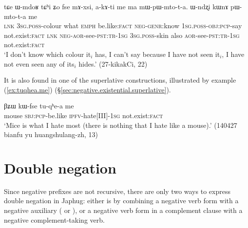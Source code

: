 \begin{exe}
	\ex \label{ex:pWmtota.me2}
	\gll  tɕe ɯ-mdoʁ tɕʰi ʑo fse mɤ-xsi, a-kɤ-ti me ma mɯ-pɯ-mto-t-a. ɯ-ndʐi kɯnɤ pɯ-mto-t-a me \\
	\textsc{lnk} \textsc{3sg}.\textsc{poss}-colour what \textsc{emph} be.like:\textsc{fact} \textsc{neg}-\textsc{genr}:know \textsc{1sg}.\textsc{poss}-\textsc{obj}:\textsc{pcp}-say not.exist:\textsc{fact} \textsc{lnk} \textsc{neg}-\textsc{aor}-see-\textsc{pst}:\textsc{tr}-\textsc{1sg} \textsc{3sg}.\textsc{poss}-skin also \textsc{aor}-see-\textsc{pst}:\textsc{tr}-\textsc{1sg} not.exist:\textsc{fact} \\
	\glt `I don't know which colour it$_i$ has, I can't say because I have not seen it$_i$, I have not even seen any of its$_i$ hides.' (27-kikakCi, 22)
\end{exe}

It is also found in one of the superlative constructions, illustrated by example (\ref{ex:tuqhea.me}) (§\ref{sec:negative.existential.superlative}).

\begin{exe}
	\ex \label{ex:tuqhea.me}
	\gll βʑɯ kɯ-fse tu-qʰe-a me \\
	mouse \textsc{sbj}:\textsc{pcp}-be.like \textsc{ipfv}-hate[III]-\textsc{1sg} not.exist:\textsc{fact} \\
	\glt `Mice is what I hate most (there is nothing that I hate like a mouse).' (140427 bianfu yu huangshulang-zh, 13)
\end{exe}

\section{Double negation} \label{sec:double.negation}
Since negative prefixes are not recursive, there are only two ways to express double negation in Japhug: either is by combining a negative verb form with a negative auxiliary ( or ), or a negative verb form in a complement clause with a negative complement-taking verb. 

